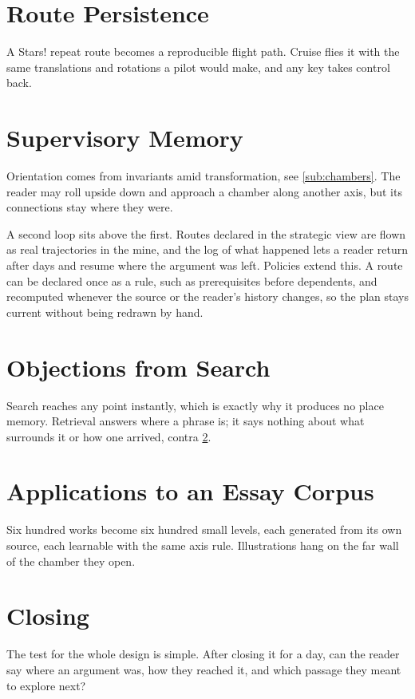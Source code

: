 \documentclass{article}
\begin{document}
\section{Route Persistence}\label{sec:routes}
A Stars! repeat route becomes a reproducible flight path. Cruise flies it with the same translations and rotations a pilot would make, and any key takes control back.
\section{Supervisory Memory}\label{sec:thesis}
Orientation comes from invariants amid transformation, see \ref{sub:chambers}. The reader may roll upside down and approach a chamber along another axis, but its connections stay where they were.

A second loop sits above the first. Routes declared in the strategic view are flown as real trajectories in the mine, and the log of what happened lets a reader return after days and resume where the argument was left.
Policies extend this. A route can be declared once as a rule, such as prerequisites before dependents, and recomputed whenever the source or the reader's history changes, so the plan stays current without being redrawn by hand.
\section{Objections from Search}\label{sec:obj}
Search reaches any point instantly, which is exactly why it produces no place memory. Retrieval answers where a phrase is; it says nothing about what surrounds it or how one arrived, contra \ref{sec:thesis}.
\section{Applications to an Essay Corpus}\label{sec:apps}
Six hundred works become six hundred small levels, each generated from its own source, each learnable with the same axis rule. Illustrations hang on the far wall of the chamber they open. 
\section{Closing}\label{sec:concl}
The test for the whole design is simple. After closing it for a day, can the reader say where an argument was, how they reached it, and which passage they meant to explore next?
\appendix
\end{document}
